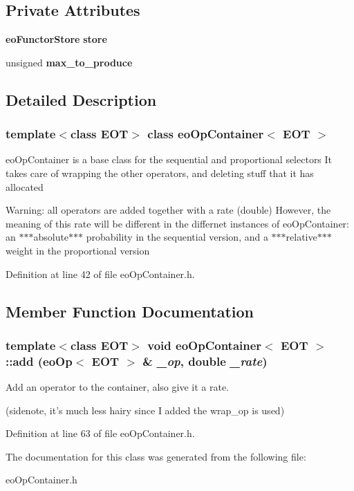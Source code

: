 \subsection*{Private Attributes}
\begin{CompactItemize}
\item 
{\bf eo\-Functor\-Store} {\bf store}\label{classeo_op_container_r0}

\item 
unsigned {\bf max\_\-to\_\-produce}\label{classeo_op_container_r1}

\end{CompactItemize}


\subsection{Detailed Description}
\subsubsection*{template$<$class EOT$>$ class eo\-Op\-Container$<$ EOT $>$}

eo\-Op\-Container is a base class for the sequential and proportional selectors It takes care of wrapping the other operators, and deleting stuff that it has allocated 

Warning: all operators are added together with a rate (double) However, the meaning of this rate will be different in the differnet instances of eo\-Op\-Container: an $\ast$$\ast$$\ast$absolute$\ast$$\ast$$\ast$ probability in the sequential version, and a $\ast$$\ast$$\ast$relative$\ast$$\ast$$\ast$ weight in the proportional version 



Definition at line 42 of file eo\-Op\-Container.h.

\subsection{Member Function Documentation}
\subsubsection{\setlength{\rightskip}{0pt plus 5cm}template$<$class EOT$>$ void {\bf eo\-Op\-Container}$<$ {\bf EOT} $>$::add ({\bf eo\-Op}$<$ {\bf EOT} $>$ \& {\em \_\-op}, double {\em \_\-rate})\hspace{0.3cm}{\tt  [inline]}}\label{classeo_op_container_a3}


Add an operator to the container, also give it a rate. 

(sidenote, it's much less hairy since I added the wrap\_\-op is used) 

Definition at line 63 of file eo\-Op\-Container.h.

The documentation for this class was generated from the following file:\begin{CompactItemize}
\item 
eo\-Op\-Container.h\end{CompactItemize}

